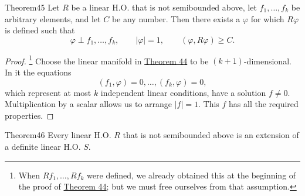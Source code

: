 ﻿\documentclass[paper=b5,fontsize=13pt,bookmarkpackage=false,twoside]{scrartcl}
\begin{document}
\begin{namedstatement}{Theorem}{45}\label{thm:45}
Let $R$ be a linear H.O. that is not semibounded above, let $f_1,\ldots,f_k$ be arbitrary elements, and let $C$ be any number. Then there exists a $\varphi$ for which $R\varphi$ is defined such that
\[
\varphi\perp f_1,\ldots,f_k,\qquad
|\varphi|=1,\qquad
(\varphi,R\varphi)\ge C.
\]
\end{namedstatement}

\begin{proof}
\footnote{\label{fn:59}When $Rf_1,\ldots,Rf_k$ were defined, we already obtained this at the beginning of the proof of \hyperref[thm:44]{Theorem 44}; but we must free ourselves from that assumption.}
Choose the linear manifold in \hyperref[thm:44]{Theorem 44} to be $(k+1)$-dimensional. In it the equations
\[
(f_1,\varphi)=0,\ldots,(f_k,\varphi)=0,
\]
which represent at most $k$ independent linear conditions, have a solution $f\ne0$. Multiplication by a scalar allows us to arrange $|f|=1$. This $f$ has all the required properties.
\end{proof}

\begin{namedstatement}{Theorem}{46}\label{thm:46}
Every linear H.O. $R$ that is not semibounded above is an extension of a definite linear H.O. $S$.
\end{namedstatement}
\end{document}
